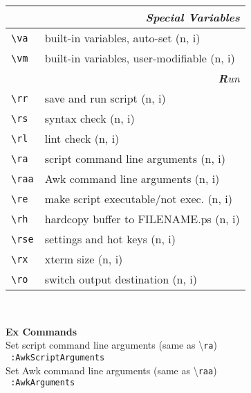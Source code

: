 \documentclass[oneside,10pt,landscape,DIV16]{scrartcl}
\begin{document}
\begin{multicols}{3}
\begin{center}
\begin{tabular}[]{|p{11mm}|p{62mm}|}
\hline
\multicolumn{2}{|r|}{\textsl{\textbf{S}pecial Variables}}            \\[1.0ex]
\hline \verb'\va'   & built-in variables, auto-set        \hfill (n, i)\\
\hline \verb'\vm'   & built-in variables, user-modifiable \hfill (n, i)\\
\hline
\hline
\multicolumn{2}{|r|}{\textsl{\textbf{R}un}} \\[1.0ex]
\hline \verb'\rr '  & save and run script                 \hfill (n, i)   \\
\hline \verb'\rs '  & syntax check                        \hfill (n, i)   \\
\hline \verb'\rl '  & lint check                          \hfill (n, i)   \\
\hline \verb'\ra '  & script command line arguments       \hfill (n, i)   \\
\hline \verb'\raa'  & Awk command line arguments          \hfill (n, i)   \\
\hline \verb'\re'   & make script executable/not exec.    \hfill (n, i)   \\
\hline \verb'\rh '  & hardcopy buffer to FILENAME.ps      \hfill (n, i)   \\
\hline \verb'\rse'  & settings and hot keys               \hfill (n, i)   \\
\hline \verb'\rx '  & xterm size                          \hfill (n, i)   \\
\hline \verb'\ro '  & switch output destination           \hfill (n, i)   \\
\hline
\end{tabular}\\
%
\begin{flushleft}
\large{\textbf{Ex Commands}}\\[1.0ex]
%
Set script command line arguments (same as \textbackslash\texttt{ra})\\[1.0ex]
\texttt{ :AwkScriptArguments}\\[1.0ex]
%
Set Awk command line arguments (same as \textbackslash\texttt{raa})\\[1.0ex]
\texttt{ :AwkArguments}\\[1.0ex]
\end{flushleft}
%
\end{center}%
\end{multicols}%
%
\end{document}
